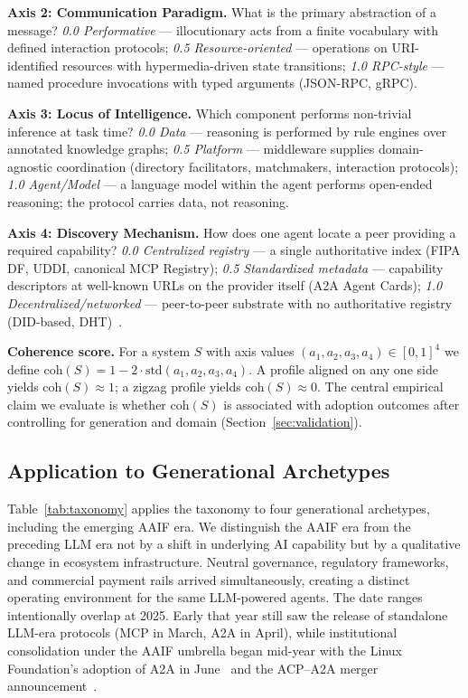 \documentclass{IEEEcsmag}
\begin{document}
\textbf{Axis 2: Communication Paradigm.}  What is the primary abstraction of a message?
\emph{0.0 Performative} --- illocutionary acts from a finite vocabulary with defined interaction protocols;
\emph{0.5 Resource-oriented} --- operations on URI-identified resources with hypermedia-driven state transitions;
\emph{1.0 RPC-style} --- named procedure invocations with typed arguments (JSON-RPC, gRPC).

\textbf{Axis 3: Locus of Intelligence.}  Which component performs non-trivial inference at task time?
\emph{0.0 Data} --- reasoning is performed by rule engines over annotated knowledge graphs;
\emph{0.5 Platform} --- middleware supplies domain-agnostic coordination (directory facilitators, matchmakers, interaction protocols);
\emph{1.0 Agent/Model} --- a language model within the agent performs open-ended reasoning; the protocol carries data, not reasoning.

\textbf{Axis 4: Discovery Mechanism.}  How does one agent locate a peer providing a required capability?
\emph{0.0 Centralized registry} --- a single authoritative index (FIPA DF, UDDI, canonical MCP Registry);
\emph{0.5 Standardized metadata} --- capability descriptors at well-known URLs on the provider itself (A2A Agent Cards);
\emph{1.0 Decentralized/networked} --- peer-to-peer substrate with no authoritative registry (DID-based, DHT)~\cite{W3C_ANP_2025}.

\textbf{Coherence score.}  For a system $S$ with axis values $(a_1, a_2, a_3, a_4) \in [0,1]^4$ we define $\mathrm{coh}(S) = 1 - 2\cdot\mathrm{std}(a_1, a_2, a_3, a_4)$.  A profile aligned on any one side yields $\mathrm{coh}(S) \approx 1$; a zigzag profile yields $\mathrm{coh}(S) \approx 0$.  The central empirical claim we evaluate is whether $\mathrm{coh}(S)$ is associated with adoption outcomes after controlling for generation and domain (Section~\ref{sec:validation}).

\subsection{Application to Generational Archetypes}

Table~\ref{tab:taxonomy} applies the taxonomy to four generational archetypes, including the emerging AAIF era.  We distinguish the AAIF era from the preceding LLM era not by a shift in underlying AI capability but by a qualitative change in ecosystem infrastructure. Neutral governance, regulatory frameworks, and commercial payment rails arrived simultaneously, creating a distinct operating environment for the same LLM-powered agents.
The date ranges intentionally overlap at 2025. Early that year still saw the release of standalone LLM-era protocols (MCP in March, A2A in April), while institutional consolidation under the AAIF umbrella began mid-year with the Linux Foundation's adoption of A2A in June~\cite{A2A_LinuxFoundation_2025} and the ACP--A2A merger announcement~\cite{ACP_Merger_2025}.
\end{document}
